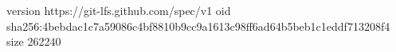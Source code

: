 version https://git-lfs.github.com/spec/v1
oid sha256:4bebdac1c7a59086c4bf8810b9cc9a1613c98ff6ad64b5beb1c1eddf713208f4
size 262240
